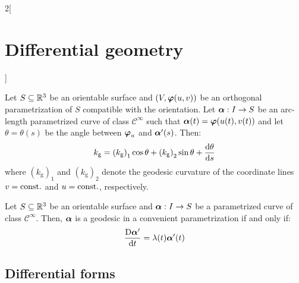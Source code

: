 \documentclass[../../../main_math.tex]{subfiles}
\begin{document}
\begin{multicols}{2}[\section{Differential geometry}]
\begin{theorem}
    Let $S\subseteq\mathbb{R}^3$ be an orientable surface and $(V,\boldsymbol{\mathrm{\varphi}}(u,v))$ be an orthogonal parametrization of $S$ compatible with the orientation. Let $\boldsymbol{\mathrm{\alpha}}:I\rightarrow S$ be an arc-length parametrized curve of class $\mathcal{C}^\infty$ such that $\boldsymbol{\mathrm{\alpha}}(t)=\boldsymbol{\mathrm{\varphi}}(u(t),v(t))$ and let $\theta=\theta(s)$ be the angle between $\boldsymbol{\mathrm{\varphi}}_u$ and $\boldsymbol{\mathrm{\alpha}}'(s)$. Then: $$k_\text{g}={(k_\text{g})}_1\cos\theta+{(k_\text{g})}_2\sin\theta+\dv{\theta}{s}$$
    where ${(k_\text{g})}_1$ and ${(k_\text{g})}_2$ denote the geodesic curvature of the coordinate lines $v=\text{const.}$ and $u=\text{const.}$, respectively.
  \end{theorem}
  \begin{proposition}
    Let $S\subseteq\mathbb{R}^3$ be an orientable surface and $\boldsymbol{\mathrm{\alpha}}:I\rightarrow S$ be a parametrized curve of class $\mathcal{C}^\infty$. Then, $\boldsymbol{\mathrm{\alpha}}$ is a geodesic in a convenient parametrization if and only if: $$\frac{\text{D}\boldsymbol{\mathrm{\alpha}}'}{\dd{t}}=\lambda(t)\boldsymbol{\mathrm{\alpha}}'(t)$$
  \end{proposition}
  \subsection{Differential forms}

\end{multicols}
\end{document}
